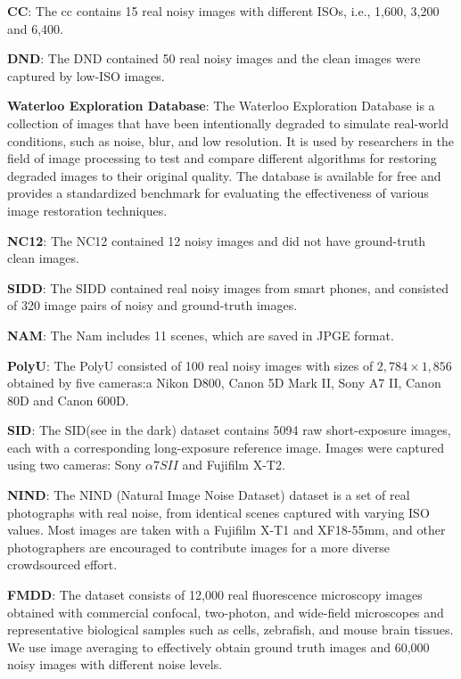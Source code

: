 \documentclass[conference]{IEEEtran}
\begin{document}
{\bf CC}\cite{nam2016holistic}: The cc contains 15 real noisy images with different ISOs, i.e., 1,600, 3,200 and 6,400.

{\bf DND}\cite{plotz2017benchmarking}: The DND contained 50 real noisy images and the clean images were captured by low-ISO images.

{\bf Waterloo Exploration Database}\cite{ma2016waterloo}: The Waterloo Exploration Database is a collection of images that have been intentionally degraded to simulate real-world conditions, such as noise, blur, and low resolution. It is used by researchers in the field of image processing to test and compare different algorithms for restoring degraded images to their original quality. The database is available for free and provides a standardized benchmark for evaluating the effectiveness of various image restoration techniques.

{\bf NC12}\cite{lebrun2015noise}: The NC12 contained 12 noisy images and did not have ground-truth clean images. 

{\bf SIDD}\cite{abdelhamed2018high}: The SIDD contained real noisy images from smart phones, and consisted of 320 image pairs of noisy and ground-truth images. 

{\bf NAM}\cite{nam2016holistic}: The Nam includes 11 scenes, which are saved in JPGE format.

{\bf PolyU}\cite{xu2018real}: The PolyU consisted of 100 real noisy images with sizes of $2,784 \times 1, 856$ obtained by five cameras:a Nikon D800, Canon 5D Mark II, Sony A7 II, Canon 80D and Canon 600D.

{\bf SID}\cite{chen2018learning}: The SID(see in the dark) dataset contains 5094 raw short-exposure images, each with a corresponding long-exposure reference image. Images were captured using two cameras: Sony $\alpha 7SII$ and Fujifilm X-T2.

{\bf NIND}\cite{brummer2019natural}: The NIND (Natural Image Noise Dataset) dataset is a set of real photographs with real noise, from identical scenes captured with varying ISO values. Most images are taken with a Fujifilm X-T1 and XF18-55mm, and other photographers are encouraged to contribute images for a more diverse crowdsourced effort.

{\bf FMDD}\cite{zhang2019poisson}: The dataset consists of 12,000 real fluorescence microscopy images obtained with commercial confocal, two-photon, and wide-field microscopes and representative biological samples such as cells, zebrafish, and mouse brain tissues. We use image averaging to effectively obtain ground truth images and 60,000 noisy images with different noise levels.
\end{document}
